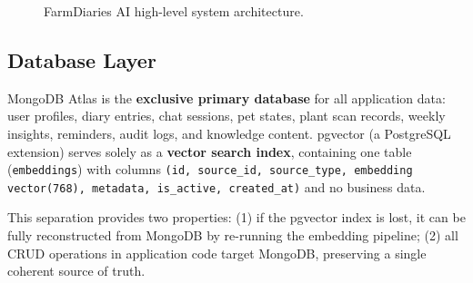\documentclass[conference]{IEEEtran}
\begin{document}
\begin{figure}[htbp]
\centering
{}
\caption{FarmDiaries AI high-level system architecture.}
\label{fig:arch}
\end{figure}

\subsection{Database Layer}

MongoDB Atlas is the \textbf{exclusive primary database} for all application data: user profiles, diary entries, chat sessions, pet states, plant scan records, weekly insights, reminders, audit logs, and knowledge content. pgvector (a PostgreSQL extension) serves solely as a \textbf{vector search index}, containing one table (\texttt{embeddings}) with columns \texttt{(id, source\_id, source\_type, embedding vector(768), metadata, is\_active, created\_at)} and no business data.

This separation provides two properties: (1) if the pgvector index is lost, it can be fully reconstructed from MongoDB by re-running the embedding pipeline; (2) all CRUD operations in application code target MongoDB, preserving a single coherent source of truth.
\end{document}
